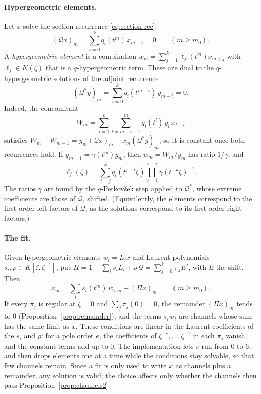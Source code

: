 \documentclass[11pt,a4paper]{article}
\theoremstyle{plain}
\theoremstyle{definition}
\theoremstyle{remark}
\begin{document}
\paragraph{Hypergeometric elements.} Let $x$ solve the section recurrence
\eqref{eq:section-rec},
\[
  (\mathcal Qx)_m=\sum_{i=0}^kq_i(t^m)\,x_{m+i}=0\qquad(m\ge m_0).
\]
A \emph{hypergeometric element} is a combination
$w_m=\sum_{j=1}^k\ell_j(t^m)x_{m+j}$ with $\ell_j\in K(\zeta)$ that is a
$q$-hypergeometric term. These are dual to the $q$-hypergeometric solutions of
the adjoint recurrence
\[
  (\mathcal Q^*y)_m=\sum_{i=0}^kq_i(t^{m-i})\,y_{m-i}=0.
\]
Indeed, the concomitant
\[
  W_m=\sum_{i=1}^k\sum_{l=m-i+1}^{m}q_i(t^l)\,y_l\,x_{l+i}
\]
satisfies $W_m-W_{m-1}=y_m(\mathcal Qx)_m-x_m(\mathcal Q^*y)_m$, so it is
constant once both recurrences hold. If $y_{m+1}=\gamma(t^m)y_m$, then
$w_m=W_m/y_m$ has ratio $1/\gamma$, and
\[
  \ell_j(\zeta)=\sum_{i=j}^kq_i(t^{j-i}\zeta)\prod_{u=1}^{i-j}\gamma(t^{-u}\zeta)^{-1}.
\]
The ratios $\gamma$ are found by the $q$-Petkov\v{s}ek step applied to
$\mathcal Q^*$, whose extreme coefficients are those of $\mathcal Q$, shifted.
(Equivalently, the elements correspond to the first-order left factors of
$\mathcal Q$, as the solutions correspond to its first-order right factors.)

\paragraph{The fit.} Given hypergeometric elements $w_i=L_ix$ and Laurent
polynomials $s_i,\rho\in K[\zeta,\zeta^{-1}]$, put
$\Pi=1-\sum_is_iL_i+\rho\,\mathcal Q=\sum_{j=0}^k\pi_jE^j$, with $E$ the shift.
Then
\[
  x_m=\sum_is_i(t^m)\,w_{i,m}+(\Pi x)_m\qquad(m\ge m_0).
\]
If every $\pi_j$ is regular at $\zeta=0$ and $\sum_j\pi_j(0)=0$, the remainder
$(\Pi x)_m$ tends to $0$ (Proposition~\ref{prop:remainder}), and the terms
$s_iw_i$ are channels whose sum has the same limit as $x$. These conditions are
linear in the Laurent coefficients of the $s_i$ and $\rho$: for a pole order
$e$, the coefficients of $\zeta^{-e},\dots,\zeta^{-1}$ in each $\pi_j$ vanish, and
the constant terms add up to $0$. The implementation lets $e$ run from $0$ to
$6$, and then drops elements one at a time while the conditions stay solvable,
so that few channels remain. Since a fit is only used to write $x$ as channels
plus a remainder, any solution is valid; the choice affects only whether the
channels then pass Proposition~\ref{prop:channels2}.
\end{document}
